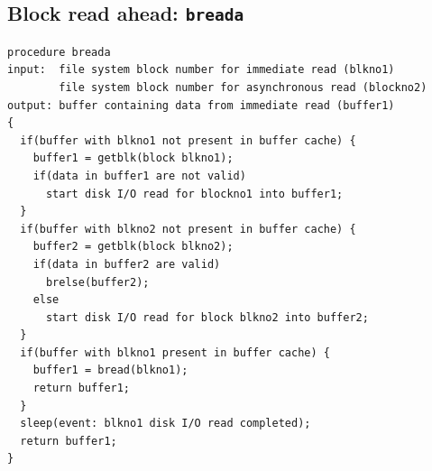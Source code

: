 \subsection*{Block read ahead: \texttt{breada}}
\begin{verbatim}
procedure breada
input:  file system block number for immediate read (blkno1)
        file system block number for asynchronous read (blockno2)
output: buffer containing data from immediate read (buffer1)
{
  if(buffer with blkno1 not present in buffer cache) {
    buffer1 = getblk(block blkno1);
    if(data in buffer1 are not valid)
      start disk I/O read for blockno1 into buffer1;
  }
  if(buffer with blkno2 not present in buffer cache) {
    buffer2 = getblk(block blkno2);
    if(data in buffer2 are valid)
      brelse(buffer2);
    else
      start disk I/O read for block blkno2 into buffer2;
  }
  if(buffer with blkno1 present in buffer cache) {
    buffer1 = bread(blkno1);
    return buffer1;
  }
  sleep(event: blkno1 disk I/O read completed);
  return buffer1;
}
\end{verbatim}


